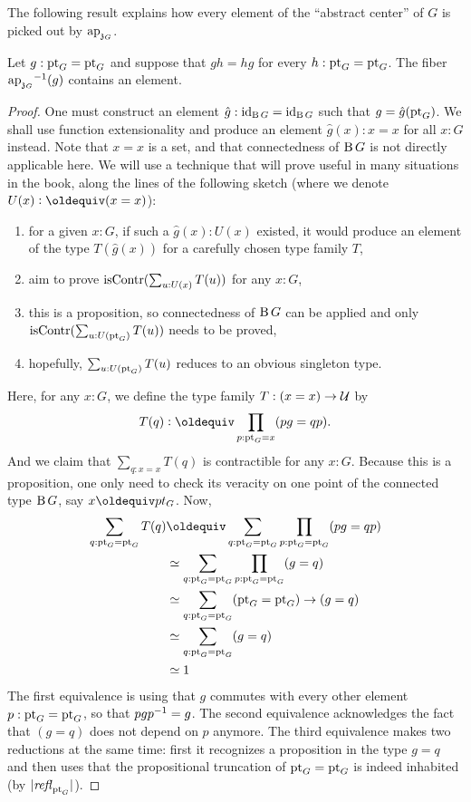 The following result explains how every element of the ``abstract
center'' of $G$ is picked out by $\mathop{\mathrm{ap}_{\mathfrak z_{{G}}}}$.
\begin{lemma}
  \label{lemma:center-inc-surj-on-paths}%
  Let $g:\mathrm{pt}_G = \mathrm{pt}_G$ and suppose that $gh=hg$ for every
  $h:\mathrm{pt}_G=\mathrm{pt}_G$. The fiber $\mathop{\mathrm{ap}_{\mathfrak z_{{G}}}}^{-1}(g)$ contains
  an element.
\end{lemma}
\begin{proof}
  One must construct an element $\hat g:\mathord{\mathrm{id}}_{\operatorname{B} G} = \mathord{\mathrm{id}}_{\operatorname{B} G}$ such that
  $g=\hat g(\mathrm{pt}_G)$. We shall use function extensionality and produce
  an element $\hat g(x):x=x$ for all $x:G$ instead. Note that $x=x$ is
  a set, and that connectedness of $\operatorname{B} G$ is not directly applicable
  here. We will use a technique that will prove useful in many
  situations in the book, along the lines of the following sketch
  (where we denote $U(x)\defequi (x=x)$):
  \begin{enumerate}
  \item for a given $x:G$, if such a $\hat g(x):U(x)$ existed, it would
    produce an element of the type $T(\hat g(x))$ for a carefully chosen type
    family $T$,
  \item aim to prove $\mathrm{isContr}(\sum_{u:U(x)}T(u))$ for any $x:G$,
  \item this is a proposition, so connectedness of ${\operatorname{B} G}$ can be applied
    and only $\mathrm{isContr}(\sum_{u:U(\mathrm{pt}_G)}T(u))$ needs to be proved,
  \item hopefully, $\sum_{u:U(\mathrm{pt}_G)}T(u)$ reduces to an obvious
    singleton type.
  \end{enumerate}
  Here, for any $x:G$, we define the type family $T: (x=x) \to {\mathcal{U}}$ by
  \begin{displaymath}
    T(q) \defequi \prod_{p:\pt_G=x} (pg=qp).
  \end{displaymath}
  And we claim that $\sum_{q:x=x}T(q)$ is contractible for any
  $x:G$. Because this is a proposition, one only need to check its
  veracity on one point of the connected type ${\operatorname{B} G}$, say $x\jdeq
  pt_G$. Now,
  \begin{displaymath}
    \begin{aligned}
      \sum_{q:\pt_G=\pt_G}T(q) &\jdeq
      \sum_{q:\pt_G=\pt_G}\prod_{p:\pt_G=\pt_G}(pg=qp)
      \\
      &\weq \sum_{q:\pt_G=\pt_G}\prod_{p:\pt_G=\pt_G}(g=q)
      \\
      &\weq \sum_{q:\pt_G=\pt_G}(\pt_G=\pt_G)\to (g=q)
      \\
      &\weq \sum_{q:\pt_G=\pt_G} (g=q)
      \\
      &\weq 1
    \end{aligned}
  \end{displaymath}
  The first equivalence is using that $g$ commutes with every other
  element $p:\mathrm{pt}_G=\mathrm{pt}_G$, so that $pg p^{-1} = g$. The second
  equivalence acknowledges the fact that $(g=q)$ does not depend on
  $p$ anymore. The third equivalence makes two reductions at the same
  time: first it recognizes a proposition in the type $g=q$ and then
  uses that the propositional truncation of $\mathrm{pt}_G=\mathrm{pt}_G$ is indeed
  inhabited (by $\lvert\mathop{\mathit{refl}_{\mathrm{pt}_G}}\rvert$).


\end{proof}
